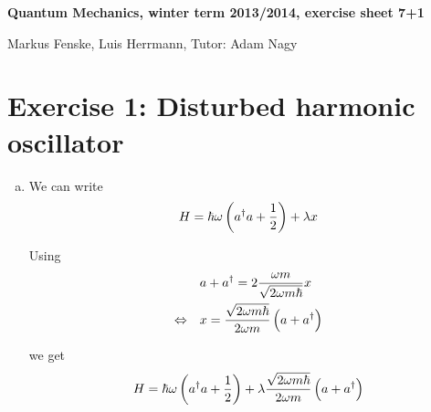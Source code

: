 \documentclass[a4paper,german,12pt,smallheadings]{scrartcl}
\begin{document}
\allowdisplaybreaks %
\begin{center}
\bfseries %
\sffamily %
\vspace{-40pt}
Quantum Mechanics, winter term 2013/2014, exercise sheet 7+1

Markus Fenske, Luis Herrmann, Tutor: Adam Nagy
\vspace{-10pt}
\end{center}

\section*{Exercise 1: Disturbed harmonic oscillator}
\begin{enumerate}[a)]
  \item
We can write
\begin{equation*}
  H = \hbar \omega \del{a^\dagger a + \frac{1}{2}} + \lambda x
\end{equation*}

Using
\begin{align*}
  &a + a^\dagger = 2 \frac{\omega m}{\sqrt{2 \omega m \hbar}} x \\
  \Leftrightarrow\quad& x = \frac{\sqrt{2 \omega m \hbar}}{2 \omega m} \del{a + a^\dagger}
\end{align*}

we get
\begin{equation*}
  H = \hbar \omega \del{a^\dagger a + \frac{1}{2}} + \lambda \frac{\sqrt{2 \omega m \hbar}}{2 \omega m} \del{a + a^\dagger}
\end{equation*}
\end{enumerate}
\end{document}
